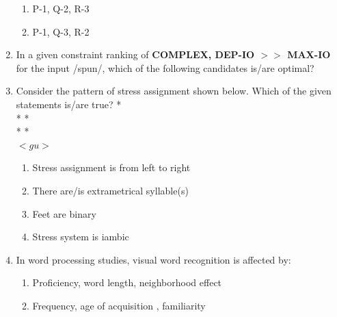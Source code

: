\documentclass[12pt]{article}
\theoremstyle{remark}
\begin{document}
\begin{enumerate}
\begin{enumerate}
\item P-1, Q-2, R-3
\item P-1, Q-3, R-2
\end{enumerate}
\hfill{}
\item In a given constraint ranking of \textbf{COMPLEX, DEP-IO $>>$ MAX-IO} for the input /spun/, which of the following candidates is/are optimal?
\begin{enumerate}  \end{enumerate}
\hfill{}
\item Consider the pattern of stress assignment shown below. Which of the given statements is/are true?
	\newline
    \vspace{0.5em}
    \hspace*{1.5em} * \\[0.2ex]
    \hspace*{1.5em} * \hspace{3.5em} * \\[0.2ex]
    \hspace*{1.5em} * \hspace{3.5em} * \\[1ex]
	 \hspace{1em}  \hspace{1em} $<gu>$
    \vspace{0.5em}
\begin{enumerate} 
\item Stress assignment is from left to right
\item There are/is extrametrical syllable(s)
\item Feet are binary
\item Stress system is iambic
\end{enumerate}
\hfill{}
\item In word processing studies, visual word recognition is affected by:
\begin{enumerate} 
\item Proficiency, word length, neighborhood effect
\item Frequency, age of acquisition , familiarity

\end{enumerate}
\end{enumerate}
\end{document}
